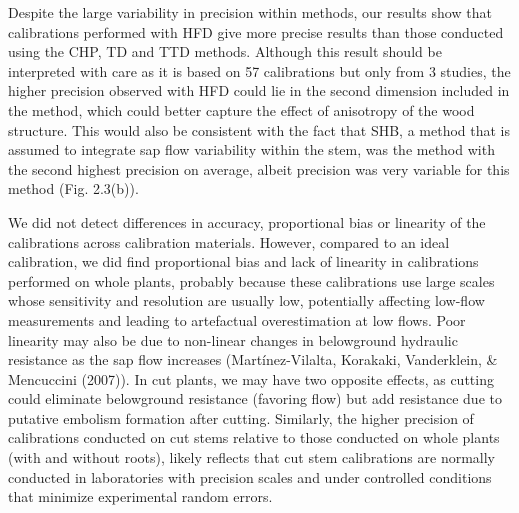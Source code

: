 \documentclass[11pt,twoside]{reedthesis}
\begin{document}
Despite the large variability in precision within methods, our results
show that calibrations performed with HFD give more precise results than
those conducted using the CHP, TD and TTD methods. Although this result
should be interpreted with care as it is based on 57 calibrations but
only from 3 studies, the higher precision observed with HFD could lie in
the second dimension included in the method, which could better capture
the effect of anisotropy of the wood structure. This would also be
consistent with the fact that SHB, a method that is assumed to integrate
sap flow variability within the stem, was the method with the second
highest precision on average, albeit precision was very variable for
this method (Fig. 2.3(b)).\par

We did not detect differences in accuracy, proportional bias or
linearity of the calibrations across calibration materials. However,
compared to an ideal calibration, we did find proportional bias and lack
of linearity in calibrations performed on whole plants, probably because
these calibrations use large scales whose sensitivity and resolution are
usually low, potentially affecting low-flow measurements and leading to
artefactual overestimation at low flows. Poor linearity may also be due
to non-linear changes in belowground hydraulic resistance as the sap
flow increases (Martínez-Vilalta, Korakaki, Vanderklein, \& Mencuccini
(2007)). In cut plants, we may have two opposite effects, as cutting
could eliminate belowground resistance (favoring flow) but add
resistance due to putative embolism formation after cutting. Similarly,
the higher precision of calibrations conducted on cut stems relative to
those conducted on whole plants (with and without roots), likely
reflects that cut stem calibrations are normally conducted in
laboratories with precision scales and under controlled conditions that
minimize experimental random errors.\par
\end{document}
